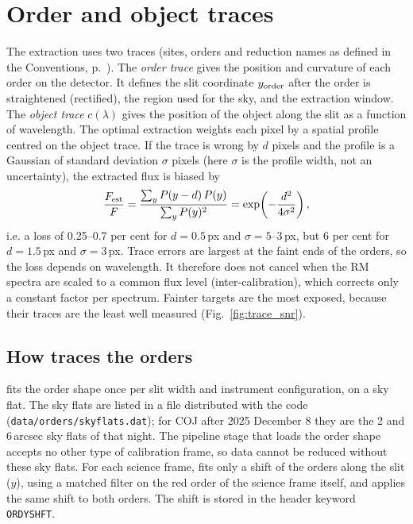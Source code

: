 \chapter{Order and object traces}
\label{sec:traces}

The extraction uses two traces (sites, orders and reduction names as defined in the Conventions, p.~\pageref{sec:conventions}). The
\emph{order trace} gives the position and curvature of each order on the detector. It defines the slit coordinate
$y_{\rm order}$ after the order is straightened (rectified), the region used for the sky, and the extraction window.
The \emph{object trace} $c(\lambda)$ gives the position of the object along the slit as a function of wavelength.
The optimal extraction weights each pixel by a spatial profile centred on the object trace. If the trace is wrong by
$d$ pixels and the profile is a Gaussian of standard deviation $\sigma$ pixels (here $\sigma$ is the profile width,
not an uncertainty), the extracted flux is biased by
\begin{equation}
\frac{F_{\rm est}}{F}=\frac{\sum_y P(y-d)\,P(y)}{\sum_y P(y)^2}=\exp\!\left(-\frac{d^2}{4\sigma^2}\right),
\label{eq:tracebias}
\end{equation}
i.e. a loss of 0.25--0.7 per cent for $d=0.5$\,px and $\sigma=5$--3\,px, but 6 per cent for $d=1.5$\,px and
$\sigma=3$\,px. Trace errors are largest at the faint ends of the orders, so the loss depends on wavelength. It
therefore does not cancel when the RM spectra are scaled to a common flux level (inter-calibration), which corrects
only a constant factor per spectrum. Fainter targets are the most exposed, because their traces are the least
well measured (Fig.~\ref{fig:trace_snr}).

\section{How \banzai{} traces the orders}
\label{sec:traces_orders}
\banzai{} fits the order shape once per slit width and instrument configuration, on a sky flat. The sky flats are
listed in a file distributed with the code (\texttt{data/orders/skyflats.dat}); for COJ after 2025 December 8 they are
the 2 and 6\,arcsec sky flats of that night. The pipeline stage that loads the order shape accepts no other type of
calibration frame, so data cannot be reduced without these sky flats. For each science frame, \banzai{} fits only a
shift of the orders along the slit ($y$), using a matched filter on the red order of the science frame itself, and
applies the same shift to both orders. The shift is stored in the header keyword \texttt{ORDYSHFT}.

